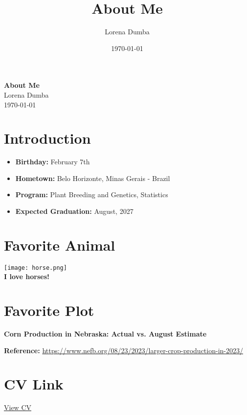 \documentclass{article}
\title{About Me}
\author{Lorena Dumba}
\date{\today}
\begin{document}
\begin{center}
    \huge{\textbf{About Me}}\\
    \vspace{1cm}
    \Large{Lorena Dumba}\\
    \vspace{0.5cm}
    \large{\today}
\end{center}
\newpage

\section*{Introduction}
\begin{itemize}
    \item \textbf{Birthday:} February 7th
    \item \textbf{Hometown:} Belo Horizonte, Minas Gerais - Brazil
    \item \textbf{Program:} Plant Breeding and Genetics, Statistics
    \item \textbf{Expected Graduation:} August, 2027
\end{itemize}
\newpage

\section*{Favorite Animal}
\begin{center}
    \texttt{[image: horse.png]}\\
    \vspace{0.5cm}
    \textbf{I love horses!}
\end{center}
\newpage

\section*{Favorite Plot}

\begin{center}
    \textbf{Corn Production in Nebraska: Actual vs. August Estimate}
\end{center}

\begin{figure}[h!]
    \centering
\end{figure}

\begin{center}
    \textbf{Reference:} \url{https://www.nefb.org/08/23/2023/larger-crop-production-in-2023/}
\end{center}
\newpage

\section*{CV Link}
\begin{center}
    \href{CV.pdf}{View CV}
\end{center}
\end{document}

